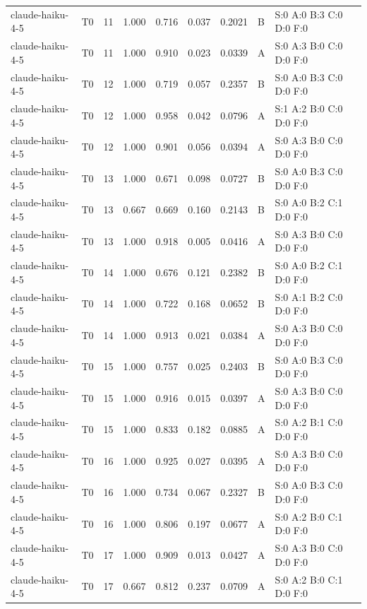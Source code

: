 \begin{longtable}{llrrrrrll}
claude-haiku-4-5 & T0 & 11 & 1.000 & 0.716 & 0.037 & 0.2021 & B & \tiny S:0 A:0 B:3 C:0 D:0 F:0 \\
claude-haiku-4-5 & T0 & 11 & 1.000 & 0.910 & 0.023 & 0.0339 & A & \tiny S:0 A:3 B:0 C:0 D:0 F:0 \\
claude-haiku-4-5 & T0 & 12 & 1.000 & 0.719 & 0.057 & 0.2357 & B & \tiny S:0 A:0 B:3 C:0 D:0 F:0 \\
claude-haiku-4-5 & T0 & 12 & 1.000 & 0.958 & 0.042 & 0.0796 & A & \tiny S:1 A:2 B:0 C:0 D:0 F:0 \\
claude-haiku-4-5 & T0 & 12 & 1.000 & 0.901 & 0.056 & 0.0394 & A & \tiny S:0 A:3 B:0 C:0 D:0 F:0 \\
claude-haiku-4-5 & T0 & 13 & 1.000 & 0.671 & 0.098 & 0.0727 & B & \tiny S:0 A:0 B:3 C:0 D:0 F:0 \\
claude-haiku-4-5 & T0 & 13 & 0.667 & 0.669 & 0.160 & 0.2143 & B & \tiny S:0 A:0 B:2 C:1 D:0 F:0 \\
claude-haiku-4-5 & T0 & 13 & 1.000 & 0.918 & 0.005 & 0.0416 & A & \tiny S:0 A:3 B:0 C:0 D:0 F:0 \\
claude-haiku-4-5 & T0 & 14 & 1.000 & 0.676 & 0.121 & 0.2382 & B & \tiny S:0 A:0 B:2 C:1 D:0 F:0 \\
claude-haiku-4-5 & T0 & 14 & 1.000 & 0.722 & 0.168 & 0.0652 & B & \tiny S:0 A:1 B:2 C:0 D:0 F:0 \\
claude-haiku-4-5 & T0 & 14 & 1.000 & 0.913 & 0.021 & 0.0384 & A & \tiny S:0 A:3 B:0 C:0 D:0 F:0 \\
claude-haiku-4-5 & T0 & 15 & 1.000 & 0.757 & 0.025 & 0.2403 & B & \tiny S:0 A:0 B:3 C:0 D:0 F:0 \\
claude-haiku-4-5 & T0 & 15 & 1.000 & 0.916 & 0.015 & 0.0397 & A & \tiny S:0 A:3 B:0 C:0 D:0 F:0 \\
claude-haiku-4-5 & T0 & 15 & 1.000 & 0.833 & 0.182 & 0.0885 & A & \tiny S:0 A:2 B:1 C:0 D:0 F:0 \\
claude-haiku-4-5 & T0 & 16 & 1.000 & 0.925 & 0.027 & 0.0395 & A & \tiny S:0 A:3 B:0 C:0 D:0 F:0 \\
claude-haiku-4-5 & T0 & 16 & 1.000 & 0.734 & 0.067 & 0.2327 & B & \tiny S:0 A:0 B:3 C:0 D:0 F:0 \\
claude-haiku-4-5 & T0 & 16 & 1.000 & 0.806 & 0.197 & 0.0677 & A & \tiny S:0 A:2 B:0 C:1 D:0 F:0 \\
claude-haiku-4-5 & T0 & 17 & 1.000 & 0.909 & 0.013 & 0.0427 & A & \tiny S:0 A:3 B:0 C:0 D:0 F:0 \\
claude-haiku-4-5 & T0 & 17 & 0.667 & 0.812 & 0.237 & 0.0709 & A & \tiny S:0 A:2 B:0 C:1 D:0 F:0 \\

\end{longtable}
